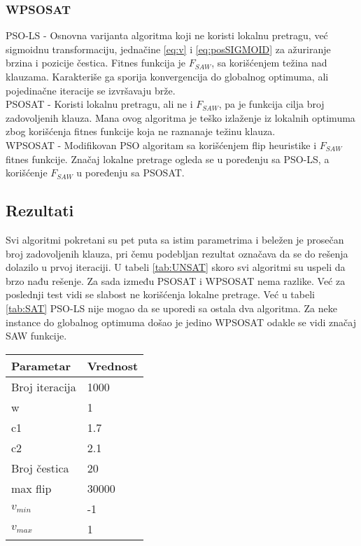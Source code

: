 \documentclass{article}
\begin{document}
\subsubsection{WPSOSAT}
\label{sec:wpsosat}


PSO-LS - Osnovna varijanta algoritma koji ne koristi lokalnu pretragu, već sigmoidnu transformaciju, jednačine \ref{eq:v} i \ref{eq:posSIGMOID} za ažuriranje brzina i pozicije čestica. Fitnes funkcija je $F_{SAW}$, sa korišćenjem težina nad klauzama. Karakteriše ga sporija konvergencija do globalnog optimuma, ali pojedinačne iteracije se izvršavaju brže.\\

PSOSAT - Koristi lokalnu pretragu, ali ne i $F_{SAW}$, pa je funkcija cilja broj zadovoljenih klauza. Mana ovog algoritma je teško izlaženje iz lokalnih optimuma zbog korišćenja fitnes funkcije koja ne raznanaje težinu klauza.\\

WPSOSAT - Modifikovan PSO algoritam sa korišćenjem flip heuristike i $F_{SAW}$ fitnes funkcije. Značaj lokalne pretrage ogleda se u poređenju sa PSO-LS, a korišćenje $F_{SAW}$ u poređenju sa PSOSAT.\\

\subsection{Rezultati}
\label{sec:pso_rezultati}

Svi algoritmi pokretani su pet puta sa istim parametrima i beležen je prosečan broj zadovoljenih klauza, pri čemu podebljan rezultat označava da se do rešenja dolazilo u prvoj iteraciji. U tabeli \ref{tab:UNSAT} skoro svi algoritmi su uspeli da brzo nađu rešenje. Za sada između PSOSAT i WPSOSAT nema razlike. Već za poslednji test vidi se slabost ne korišćenja lokalne pretrage. Već u tabeli \ref{tab:SAT} PSO-LS nije mogao da se uporedi sa ostala dva algoritma. Za neke instance do globalnog optimuma došao je jedino WPSOSAT odakle se vidi značaj SAW funkcije.

\begin{table}[h!]
\centering
{}\label{tab:parametri} 
\begin{tabular}{ |p{3cm}|p{2cm}| }
 \hline
 Parametar 	& Vrednost\\
 \hline
 Broj iteracija & 1000 \\
 \hline
 w 				& 1\\
 \hline
 c1 			& 1.7\\
 \hline
 c2				& 2.1\\ 
 \hline
 Broj čestica	& 20\\
 \hline
 max flip & 30000 \\
 \hline
 $v_{min}$ 		& -1\\
 \hline
 $v_{max}$		& 1\\ 
 \hline
\end{tabular}
\end{table}
\end{document}

